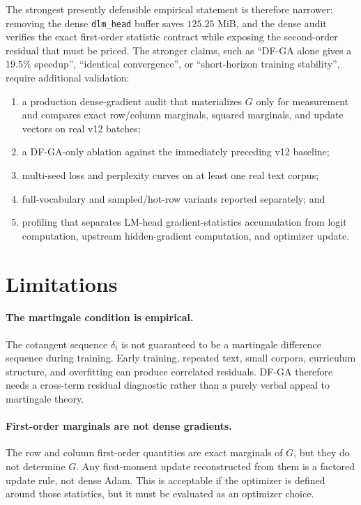 \documentclass{article}
\begin{document}
The strongest presently defensible empirical statement is therefore narrower:
removing the dense \texttt{dlm\_head} buffer saves $125.25$ MiB, and the dense
audit verifies the exact first-order statistic contract while exposing the
second-order residual that must be priced. The stronger claims, such as
``DF-GA alone gives a $19.5\%$ speedup'', ``identical convergence'', or
``short-horizon training stability'', require additional validation:
\begin{enumerate}
  \item a production dense-gradient audit that materializes $G$ only for
  measurement and compares exact row/column marginals, squared marginals, and
  update vectors on real v12 batches;
  \item a DF-GA-only ablation against the immediately preceding v12 baseline;
  \item multi-seed loss and perplexity curves on at least one real text corpus;
  \item full-vocabulary and sampled/hot-row variants reported separately; and
  \item profiling that separates LM-head gradient-statistics accumulation from
  logit computation, upstream hidden-gradient computation, and optimizer update.
\end{enumerate}

\section{Limitations}

\paragraph{The martingale condition is empirical.}
The cotangent sequence $\delta_t$ is not guaranteed to be a martingale
difference sequence during training. Early training, repeated text, small
corpora, curriculum structure, and overfitting can produce correlated residuals.
DF-GA therefore needs a cross-term residual diagnostic rather than a purely
verbal appeal to martingale theory.

\paragraph{First-order marginals are not dense gradients.}
The row and column first-order quantities are exact marginals of $G$, but they
do not determine $G$. Any first-moment update reconstructed from them is a
factored update rule, not dense Adam. This is acceptable if the optimizer is
defined around those statistics, but it must be evaluated as an optimizer
choice.
\end{document}
